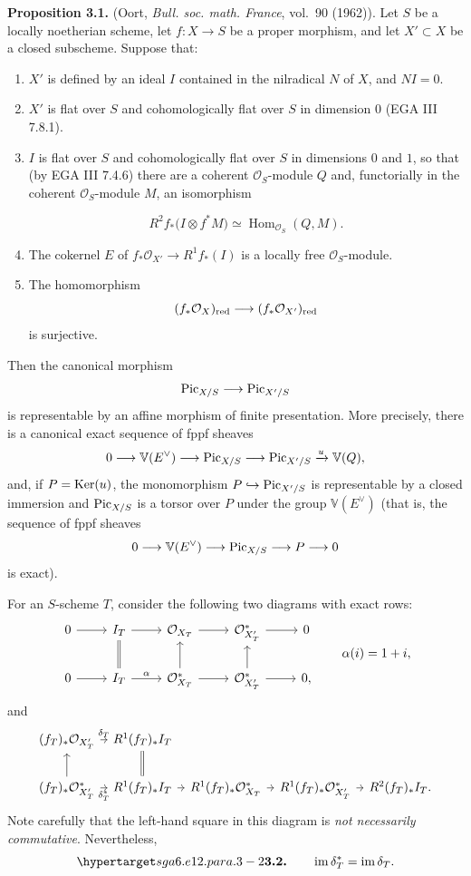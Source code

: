 \textbf{Proposition 3.1.} (Oort, \emph{Bull. soc. math. France}, vol.~90
(1962)). Let $S$ be a locally noetherian scheme, let $f:X\to S$ be a proper
morphism, and let $X'\subset X$ be a closed subscheme. Suppose that:
\begin{enumerate}[label=\roman*)]
\item $X'$ is defined by an ideal $I$ contained in the nilradical $N$ of
  $X$, and $NI=0$.
\item $X'$ is flat over $S$ and cohomologically flat over $S$ in dimension
  $0$ (EGA III 7.8.1).
\item $I$ is flat over $S$ and cohomologically flat over $S$ in dimensions
  $0$ and $1$, so that (by EGA III 7.4.6) there are a coherent
  $\mathcal O_S$-module $Q$ and, functorially in the coherent
  $\mathcal O_S$-module $M$, an isomorphism

\[
  R^2f_*\bigl(I\otimes f^*M\bigr)
  \simeq\operatorname{Hom}_{\mathcal O_S}(Q,M).
\]
\item The cokernel $E$ of
  $f_*\mathcal O_{X'}\to R^1f_*(I)$ is a locally free
  $\mathcal O_S$-module.
\item The homomorphism
  \[
    (f_*\mathcal O_X)_{\mathrm{red}}
    \longrightarrow(f_*\mathcal O_{X'})_{\mathrm{red}}
  \]
  is surjective.
\end{enumerate}
Then the canonical morphism
\[
  \operatorname{Pic}_{X/S}\longrightarrow\operatorname{Pic}_{X'/S}
\]
is representable by an affine morphism of finite presentation. More
precisely, there is a canonical exact sequence of fppf sheaves
\[
  0\longrightarrow\mathbb V(E^\vee)\longrightarrow\operatorname{Pic}_{X/S}
  \longrightarrow\operatorname{Pic}_{X'/S}\xrightarrow{u}\mathbb V(Q),
\]
and, if $P=\operatorname{Ker}(u)$, the monomorphism
$P\hookrightarrow\operatorname{Pic}_{X'/S}$ is representable by a closed immersion and
$\operatorname{Pic}_{X/S}$ is a torsor over $P$ under the group $\mathbb V(E^\vee)$
(that is, the sequence of fppf sheaves
\[
  0\longrightarrow\mathbb V(E^\vee)\longrightarrow\operatorname{Pic}_{X/S}
  \longrightarrow P\longrightarrow0
\]
is exact).

For an $S$-scheme $T$, consider the following two diagrams with exact rows:
\[
\begin{tikzcd}
0 \arrow[r] & I_T \arrow[r] & \mathcal O_{X_T} \arrow[r] &
  \mathcal O_{X'_T}^{*} \arrow[r] & 0\\
0 \arrow[r] & I_T \arrow[r,"\alpha"] \arrow[u,equal] &
  \mathcal O_{X_T}^{*} \arrow[r] \arrow[u] &
  \mathcal O_{X'_T}^{*} \arrow[r] \arrow[u] & 0,
\end{tikzcd}
\qquad \alpha(i)=1+i,
\]
and
\[
\begin{tikzcd}[column sep=tiny]
(f_T)_*\mathcal O_{X'_T} \arrow[r,"\delta_T"] &
  R^1(f_T)_*I_T \arrow[d,equal]\\
(f_T)_*\mathcal O_{X'_T}^{*} \arrow[r,"\delta_T^*"'] \arrow[u] &
  R^1(f_T)_*I_T \arrow[r] &
  R^1(f_T)_*\mathcal O_{X_T}^{*} \arrow[r] &
  R^1(f_T)_*\mathcal O_{X'_T}^{*} \arrow[r] &
  R^2(f_T)_*I_T.
\end{tikzcd}
\]
Note carefully that the left-hand square in this diagram is \emph{not
necessarily commutative}. Nevertheless,
\[
  \sgaStableTarget{sga6.e12.para.3-2}\textbf{3.2.}\qquad \operatorname{im}\delta_T^*
  =\operatorname{im}\delta_T.
\]

